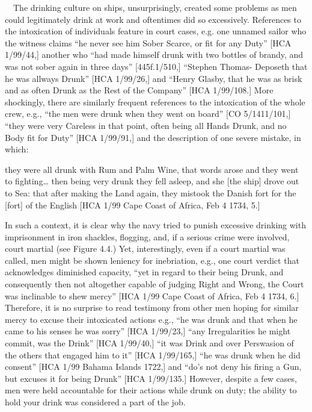 \begin{styleStandard}
\ \ The drinking culture on ships, unsurprisingly, created some problems as men could legitimately drink at work and oftentimes did so excessively. References to the intoxication of individuals feature in court cases, e.g. one unnamed sailor who the witness claims “he never see him Sober Scarce, or fit for any Duty” [HCA 1/99/44,] another who “had made himself drunk with two bottles of brandy, and was not sober again in three days” [445f.1/510,] “Stephen Thomas- Deposeth that he was allways Drunk” [HCA 1/99/26,] and “Henry Glasby, that he was as brisk and as often Drunk as the Rest of the Company” [HCA 1/99/108.] More shockingly, there are similarly frequent references to the intoxication of the whole crew, e.g., “the men were drunk when they went on board” [CO 5/1411/101,] “they were very Careless in that point, often being all Hands Drunk, and no Body fit for Duty” [HCA 1/99/91,] and the description of one severe mistake, in which: 
\end{styleStandard}

\begin{styleStandard}
they were all drunk with Rum and Palm Wine, that words arose and they went to fighting… then being very drunk they fell asleep, and she [the ship] drove out to Sea: that after making the Land again, they mistook the Danish fort for the [fort] of the English [HCA 1/99 Cape Coast of Africa, Feb 4 1734, 5.]
\end{styleStandard}

\begin{styleStandard}
In such a context, it is clear why the navy tried to punish excessive drinking with imprisonment in iron shackles, flogging, and, if a serious crime were involved, court martial (see Figure 4.4.) Yet, interestingly, even if a court martial was called, men might be shown leniency for inebriation, e.g., one court verdict that acknowledges diminished capacity, “yet in regard to their being Drunk, and consequently then not altogether capable of judging Right and Wrong, the Court was inclinable to shew mercy” [HCA 1/99 Cape Coast of Africa, Feb 4 1734, 6.] Therefore, it is no surprise to read testimony from other men hoping for similar mercy to excuse their intoxicated actions e.g., “he was drunk and that when he came to his senses he was sorry” [HCA 1/99/23,] “any Irregularities he might commit, was the Drink” [HCA 1/99/40,] “it was Drink and over Perswasion of the others that engaged him to it” [HCA 1/99/165,] “he was drunk when he did consent” [HCA 1/99 Bahama Islands 1722,] and “do’s not deny his firing a Gun, but excuses it for being Drunk” [HCA 1/99/135.] However, despite a few cases, men were held accountable for their actions while drunk on duty; the ability to hold your drink was considered a part of the job. 
\end{styleStandard}

